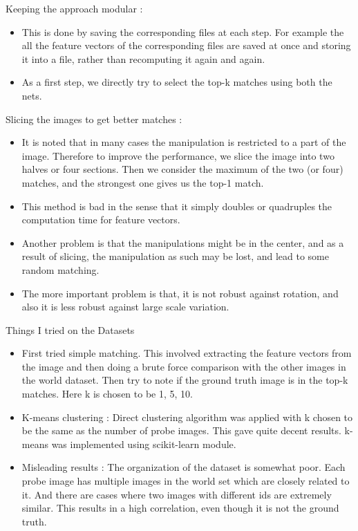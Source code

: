 \documentclass{article}
\begin{document}
Keeping the approach modular :
\begin{itemize}
\item This is done by saving the corresponding files at each step. For example the all the feature vectors of the corresponding files are saved at once and storing it into a file, rather than recomputing it again and again.
\item As a first step, we directly try to select the top-k matches using both the nets.
\end{itemize}

Slicing the images to get better matches :
\begin{itemize}
\item It is noted that in many cases the manipulation is restricted to a part of the image. Therefore to improve the performance, we slice the image into two halves or four sections. Then we consider the maximum of the two (or four) matches, and the strongest one gives us the top-1 match.
\item This method is bad in the sense that it simply doubles or quadruples the computation time for feature vectors.
\item Another problem is that the manipulations might be in the center, and as a result of slicing, the manipulation as such may be lost, and lead to some random matching.
\item The more important problem is that, it is not robust against rotation, and also it is less robust against large scale variation.
\end{itemize}

Things I tried on the Datasets
\begin{itemize}
\item First tried simple matching. This involved extracting the feature vectors from the image and then doing a brute force comparison with the other images in the world dataset. Then try to note if the ground truth image is in the top-k matches. Here k is chosen to be 1, 5, 10.
\item K-means clustering : Direct clustering algorithm was applied with k chosen to be the same as the number of probe images. This gave quite decent results. k-means was implemented using scikit-learn module.
\item Misleading results : The organization of the dataset is somewhat poor. Each probe image has multiple images in the world set which are closely related to it. And there are cases where two images with different ids are extremely similar. This results in a high correlation, even though it is not the ground truth.
\end{itemize}
\end{document}
